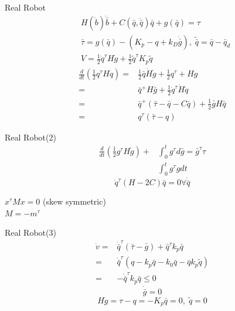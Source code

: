 \documentclass{beamer}
\begin{document}
\begin{frame}{Real Robot}
    \begin{align*}
        &H(\dot{b})\ddot{\bar{b}}+ C(\bar{q},\ddot{\bar{q}})\bar{q}+g(\bar{q})=\tau\\
        &\bar{\tau}=g(\bar{q})-(K_p-q+k_D\dot{\bar{g}}), \; \tilde{\bar{q}}=\bar{q}-\bar{q}_d\\
        &V=\frac{1}{2}\dot{q}^\tau H \dot{g}+ \frac{1}{2} \tilde{q}^\tau K_p \tilde{q}
    \end{align*}
    \begin{align*}
    \frac{d}{dt}(\frac{1}{2} q^\tau H \dot{q}) =& \frac{1}{2} \bar{q} \dot{H}\dot{g}+\frac{1}{2}q^\tau +Hg\\
    =& \bar{q}^+ H\bar{g}+\frac{1}{2}\dot{q}^\tau \dot{H}\dot{q}\\
    =& \bar{q}^+ (\bar{\tau}-\bar{q}-C\bar{q})+\frac{1}{2}\bar{g}H\bar{q}\\
    =& q^\tau(\bar{\tau}-q)
    \end{align*}
\end{frame}

\begin{frame}{Real Robot(2)}
    \begin{align*}
        \frac{d}{dt} (\frac{1}{2}g^\tau H\dot{g})+&\int_0^t g^\tau d\bar{g} = \bar{g}^\tau \tau\\
        &\int_0^t g^\tau g dt
    \end{align*}
    $$\dot{q}^\tau(H-2C)\bar{q}=0\forall \dot{\bar{q}}$$

    $x^\tau Mx = 0$ (skew symmetric)\\
    $M=-m^\tau$
\end{frame}

\begin{frame}{Real Robot(3)}
    \begin{align*}
        \dot{v} =& \dot{\bar{q}}^\tau (\bar{\tau}-\bar{g})+\bar{q}^\tau k_p \bar{q}\\
        =& \dot{\bar{q}}^\tau(q-k_p \bar{q}-k_0 \bar{q}-\bar{q}k_p \tilde{q})\\
        =& -\dot{\bar{q}}^\tau k_p \bar{q} \leq 0
    \end{align*}
    $$\dot{\bar{g}}=0$$
    $$H\ddot{g}=\tau-q=-K_p\bar{q}=0, \; \tilde{q}=0$$
\end{frame}
\end{document}
